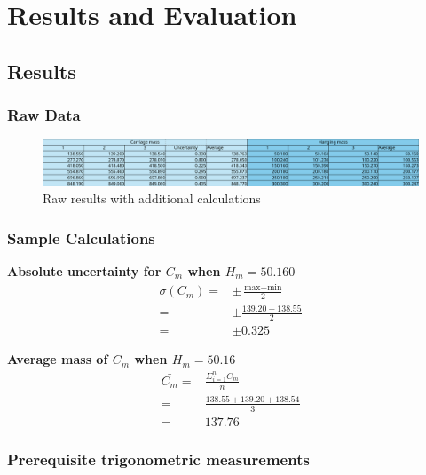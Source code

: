 \documentclass[11pt,a4paper]{article}
\begin{document}
\section{Results and Evaluation}
\subsection{Results}

\subsubsection{Raw Data}
\begin{center}
	\centering
	\begin{figure}[h]
		\centering
		\includegraphics[width=0.84\paperwidth]{resultstable.png}
		\caption{Raw results with additional calculations}
	\end{figure}
	
\end{center}


\subsubsection{Sample Calculations}
\begin{center}
\textbf{Absolute uncertainty for $C_m$ when $H_m=50.160$}
\begin{align*}
	\sigma(C_m)=&\pm\frac{\textrm{max}-\textrm{min}}{2}\\
	=&\pm\frac{139.20-138.55}{2}
	\\=&\pm0.325
\end{align*}
\newline

\textbf{Average mass of $C_m$ when $H_m=50.16$}
\begin{align*}
	\bar{C_m}=&\frac{\Sigma^n_{i=1}C_m}{n}\\
	=&\frac{138.55+139.20+138.54}{3}\\
	=&137.76
\end{align*}
\end{center}


\subsubsection{Prerequisite trigonometric measurements}
\end{document}
